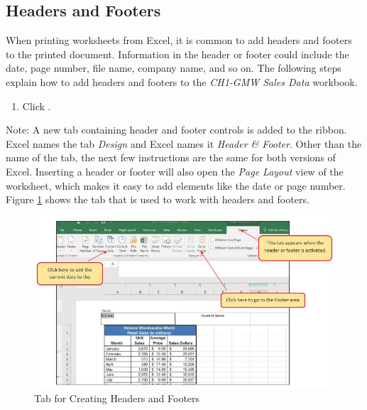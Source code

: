\subsection{Headers and Footers}

When printing worksheets from Excel, it is common to add headers and footers to the printed document. Information in the header or footer could include the date, page number, file name, company name, and so on. The following steps explain how to add headers and footers to the \textit{CH1-GMW Sales Data} workbook.

\begin{enumerate}
	\item Click . 
\end{enumerate}

Note: A new tab containing header and footer controls is added to the ribbon. Excel  names the tab \textit{Design} and Excel  names it \textit{Header \& Footer}. Other than the name of the tab, the next few instructions are the same for both versions of Excel. Inserting a header or footer will also open the \textit{Page Layout} view of the worksheet, which makes it easy to add elements like the date or page number. Figure \ref{01:fig50} shows the tab that is used to work with headers and footers.

\begin{figure}[H]
	\centering
	\includegraphics[width=\maxwidth{.95\linewidth}]{gfx/ch01_fig50}
	\caption{Tab for Creating Headers and Footers}
	\label{01:fig50}
\end{figure}

